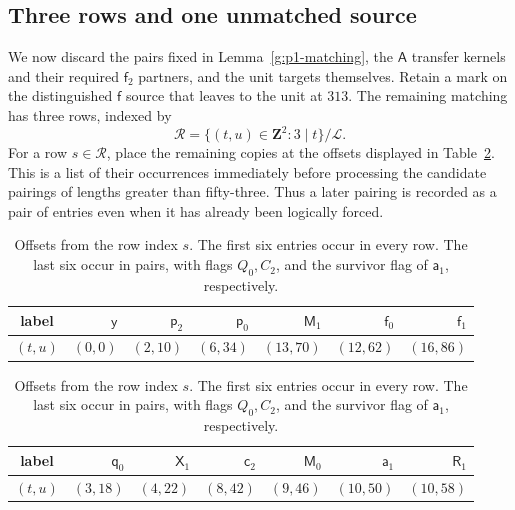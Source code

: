 \documentclass[11pt]{article}
\theoremstyle{definition}
\theoremstyle{remark}
\numberwithin{equation}{section}
\begin{document}
\subsection{Three rows and one unmatched source}

We now discard the pairs fixed in Lemma~\ref{g:p1-matching},
the $\mathsf A$ transfer kernels and their required
$\mathsf f_2$ partners, and the unit targets themselves.
Retain a mark on the distinguished $\mathsf f$ source
that leaves to the unit at $313$.  The remaining
matching has three rows, indexed by
\[
 \mathcal R=\{(t,u)\in\mathbf Z^2:3\mid t\}/\mathcal L.
\]
For a row $s\in\mathcal R$, place the remaining copies
at the offsets displayed in Table~\ref{g:row-offsets}.
This is a list of their occurrences immediately
before processing the candidate pairings of lengths
greater than fifty-three.  Thus a later pairing is
recorded as a pair of entries even when it has already
been logically forced.

\begin{table}[htbp]

\setlength{\tabcolsep}{5pt}
\begin{tabular}{c|rrrrrr}
\toprule
label&$\mathsf y$&$\mathsf p_2$&$\mathsf p_0$&
 $\mathsf M_1$&$\mathsf f_0$&$\mathsf f_1$\\\midrule
$(t,u)$&$(0,0)$&$(2,10)$&$(6,34)$&
 $(13,70)$&$(12,62)$&$(16,86)$\\\bottomrule
\end{tabular}

 
\begin{tabular}{c|rrrrrr}
\toprule
label&$\mathsf q_0$&$\mathsf X_1$&$\mathsf c_2$&
 $\mathsf M_0$&$\mathsf a_1$&$\mathsf R_1$\\\midrule
$(t,u)$&$(3,18)$&$(4,22)$&$(8,42)$&
 $(9,46)$&$(10,50)$&$(10,58)$\\\bottomrule
\end{tabular}
\caption{Offsets from the row index $s$.  The first six
entries occur in every row.  The last six occur in
pairs, with flags $Q_0,C_2$, and the survivor flag of
$\mathsf a_1$, respectively.}\label{g:row-offsets}
\end{table}
\end{document}
